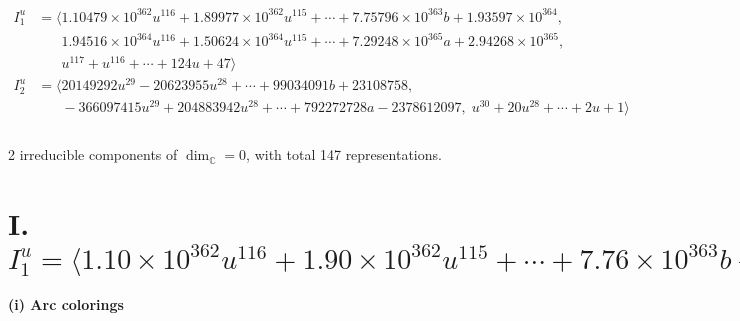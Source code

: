 \documentclass[1p]{elsarticle_modified}
\theoremstyle{definition}
\begin{document}
\begin{align*}
I^u_{1}&=\langle 
1.10479\times10^{362} u^{116}+1.89977\times10^{362} u^{115}+\cdots+7.75796\times10^{363} b+1.93597\times10^{364},\\
\phantom{I^u_{1}}&\phantom{= \langle  }1.94516\times10^{364} u^{116}+1.50624\times10^{364} u^{115}+\cdots+7.29248\times10^{365} a+2.94268\times10^{365},\\
\phantom{I^u_{1}}&\phantom{= \langle  }u^{117}+u^{116}+\cdots+124 u+47\rangle \\
I^u_{2}&=\langle 
20149292 u^{29}-20623955 u^{28}+\cdots+99034091 b+23108758,\\
\phantom{I^u_{2}}&\phantom{= \langle  }-366097415 u^{29}+204883942 u^{28}+\cdots+792272728 a-2378612097,\;u^{30}+20 u^{28}+\cdots+2 u+1\rangle \\
\\
\end{align*}
\raggedright * 2 irreducible components of $\dim_{\mathbb{C}}=0$, with total 147 representations.\\
\newpage
\renewcommand{\arraystretch}{1}
\centering \section*{I. $I^u_{1}= \langle 1.10\times10^{362} u^{116}+1.90\times10^{362} u^{115}+\cdots+7.76\times10^{363} b+1.94\times10^{364},\;1.95\times10^{364} u^{116}+1.51\times10^{364} u^{115}+\cdots+7.29\times10^{365} a+2.94\times10^{365},\;u^{117}+u^{116}+\cdots+124 u+47 \rangle$}
\flushleft \textbf{(i) Arc colorings}\\
\end{document}
